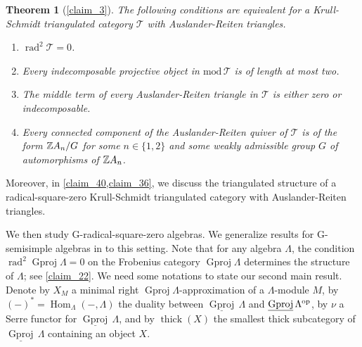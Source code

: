 \documentclass[12pt]{amsart}
\numberwithin{equation}{subsection}
\theoremstyle{plain}
\newtheorem{theorem}{Theorem}[section]
\theoremstyle{definition}
\newcommand{\Hom}{\operatorname{Hom}}
\newcommand{\rad}{\operatorname{rad}}
\renewcommand{\mod}{\mathrm{mod}\,}
\newcommand{\Gproj}{\operatorname{Gproj}}
\newcommand{\sGproj}{\underline{\operatorname{Gproj}}\,}
\newcommand{\thick}{\operatorname{thick}}
\newcommand{\Z}{\operatorname{\mathbb{Z}}\nolimits}
\renewcommand{\L}{\Lambda}
\newcommand{\T}{\mathcal{T}}
\newcommand{\ZA}{\Z\hspace{-.6mm}A}
\newcommand{\op}{{\rm op}}
\begin{document}
\begin{theorem}[{\cref{claim_3}}]
The following conditions are equivalent for a Krull-Schmidt triangulated category $\T$ with Auslander-Reiten triangles.
\begin{enumerate}
\item $\rad^2\T = 0$.
\item Every indecomposable projective object in $\mod\T$ is of length at most two.
\item The middle term of every Auslander-Reiten triangle in $\T$ is either zero or indecomposable.
\item Every connected component of the Auslander-Reiten quiver of $\T$ is of the form $\ZA_n/G$ for some $n \in\{1, 2\}$ and some weakly admissible group $G$ of automorphisms of $\ZA_n$.  
\end{enumerate}
\end{theorem}
Moreover, in \cref{claim_40,claim_36}, we discuss the triangulated structure of a radical-square-zero Krull-Schmidt triangulated category with Auslander-Reiten triangles.




We then study G-radical-square-zero algebras.
We generalize results for G-semisimple algebras in \cite[Section 3]{Hafezi-Bahlekeh_2024} to this setting.
Note that for any algebra $\L$, the condition $\rad^2\Gproj\L=0$ on the Frobenius category $\Gproj\L$ determines the structure of $\L$; see \cref{claim_22}.
We need some notations to state our second main result.
Denote by $X_M$ a minimal right $\Gproj\L$-approximation of a $\L$-module $M$, by $(-)^*=\Hom_\L(-, \L)$ the duality between $\sGproj\L$ and $\sGproj\L^\op$, by $\nu$ a Serre functor for $\sGproj\L$, and by $\thick(X)$ the smallest thick subcategory of $\sGproj\L$ containing an object $X$.
\end{document}
